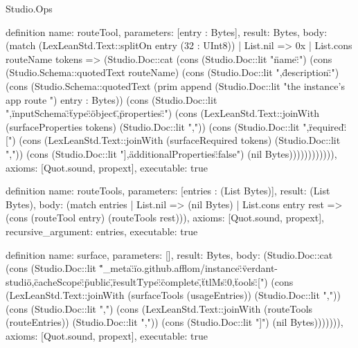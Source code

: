 \begin{lexlean}{Studio.Ops}
\begin{semanticmodule}
{definition{
  name: routeTool,
  parameters: [entry : Bytes],
  result: Bytes,
  body: (match (LexLeanStd.Text::splitOn entry (32 : UInt8))
    | List.nil => 0x
    | List.cons routeName tokens => (Studio.Doc::cat (cons (Studio.Doc::lit "{\"name\":") (cons (Studio.Schema::quotedText routeName) (cons (Studio.Doc::lit ",\"description\":") (cons (Studio.Schema::quotedText (prim append (Studio.Doc::lit "the instance's app route ") entry : Bytes)) (cons (Studio.Doc::lit ",\"inputSchema\":{\"type\":\"object\",\"properties\":{") (cons (LexLeanStd.Text::joinWith (surfaceProperties tokens) (Studio.Doc::lit ",")) (cons (Studio.Doc::lit "},\"required\":[") (cons (LexLeanStd.Text::joinWith (surfaceRequired tokens) (Studio.Doc::lit ",")) (cons (Studio.Doc::lit "],\"additionalProperties\":false}}") (nil Bytes)))))))))))),
  axioms: [Quot.sound, propext],
  executable: true
}

definition{
  name: routeTools,
  parameters: [entries : (List Bytes)],
  result: (List Bytes),
  body: (match entries
    | List.nil => (nil Bytes)
    | List.cons entry rest => (cons (routeTool entry) (routeTools rest))),
  axioms: [Quot.sound, propext],
  recursive_argument: entries,
  executable: true
}

definition{
  name: surface,
  parameters: [],
  result: Bytes,
  body: (Studio.Doc::cat (cons (Studio.Doc::lit "{\"_meta\":{\"io.github.afflom/instance\":\"verdant-studio\"},\"cacheScope\":\"public\",\"resultType\":\"complete\",\"ttlMs\":0,\"tools\":[") (cons (LexLeanStd.Text::joinWith (surfaceTools (usageEntries)) (Studio.Doc::lit ",")) (cons (Studio.Doc::lit ",") (cons (LexLeanStd.Text::joinWith (routeTools (routeEntries)) (Studio.Doc::lit ",")) (cons (Studio.Doc::lit "]}\n") (nil Bytes))))))),
  axioms: [Quot.sound, propext],
  executable: true
}

}
\end{semanticmodule}
\end{lexlean}
